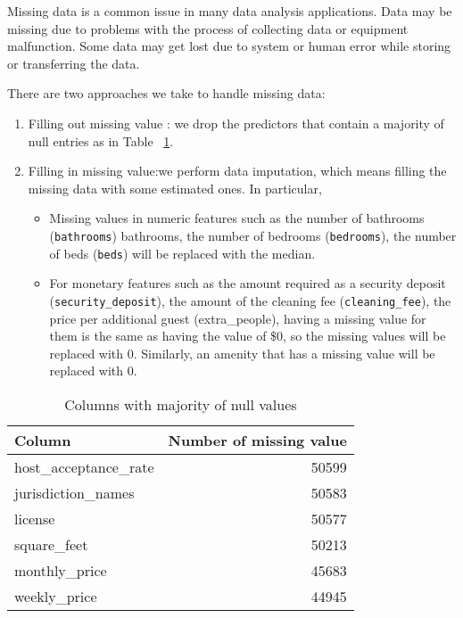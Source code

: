 Missing data is a common issue in many data analysis applications.  Data may be
missing due to problems with the process of collecting data or equipment
malfunction. Some data may get lost due to system or human error while storing
or transferring the data.

There are two approaches we take to handle missing
data:
\begin{enumerate}
    \item Filling out missing value :  we drop the predictors
        that contain a majority of null entries as in Table
        ~\ref{tab:missing-value}.
    \item Filling in missing value:we perform data imputation, which means
        filling the missing data with some estimated ones. In particular,

        \begin{itemize}

            \item Missing values in numeric features such as the number of
                bathrooms (\texttt{bathrooms}) bathrooms, the number of bedrooms
                (\texttt{bedrooms}), the number of beds (\texttt{beds}) will be
                replaced with the median.

            \item For monetary features such as the amount required as a
                security deposit (\texttt{security\_deposit}), the amount of the cleaning
                fee (\texttt{cleaning\_fee}), the price per additional guest
                (extra\_people), having a missing value for them is the same as
                having the value of \$0, so the missing values will be replaced
                with 0. Similarly, an amenity that has a missing value will be replaced with 0.

        \end{itemize}
\end{enumerate}

\begin{table}[htp]
    \centering
    \caption{Columns with majority of null values}
    \label{tab:missing-value}
{\small
\begin{tabular}{lr}
\toprule
{Column} &      Number of missing value \\
\midrule
host\_acceptance\_rate &  50599 \\
jurisdiction\_names   &  50583 \\
license              &  50577 \\
square\_feet          &  50213 \\
monthly\_price        &  45683 \\
weekly\_price         &  44945 \\
\bottomrule
\end{tabular}

}
\end{table}

